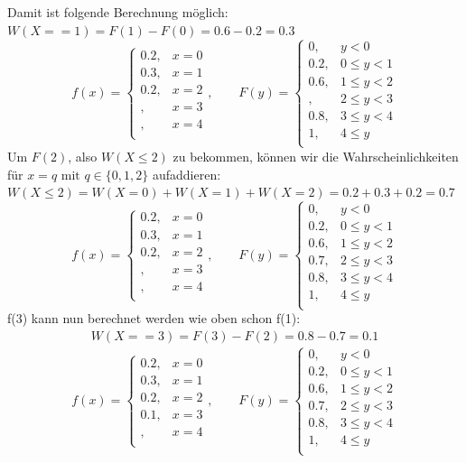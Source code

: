 \documentclass[11pt, a4paper]{article}
\begin{document}
Damit ist folgende Berechnung möglich: $W(X == 1) = F(1) - F(0) = 0.6 - 0.2 = 0.3$
\[
f(x) = 
\begin{cases}
	0.2, & x = 0 \\
	0.3, & x = 1 \\
	0.2, & x = 2 \\
	, & x = 3 \\
	, & x = 4 \\
\end{cases}, \qquad
F(y) =
\begin{cases}
	0, & y < 0 \\
	0.2, & 0 \leq y < 1 \\
	0.6, & 1 \leq y < 2 \\
	, & 2 \leq y < 3 \\
	0.8, & 3 \leq y < 4 \\
	1, & 4 \leq y \\
\end{cases}
\]
Um $F(2)$, also $W(X \leq 2)$ zu bekommen, können wir die Wahrscheinlichkeiten für $x = q \text{ mit } q \in \{0,1,2\}$ aufaddieren: $W(X \leq 2) = W(X = 0) + W(X = 1) + W(X = 2) = 0.2 + 0.3 + 0.2 = 0.7$
\[
f(x) = 
\begin{cases}
	0.2, & x = 0 \\
	0.3, & x = 1 \\
	0.2, & x = 2 \\
	, & x = 3 \\
	, & x = 4 \\
\end{cases}, \qquad
F(y) =
\begin{cases}
	0, & y < 0 \\
	0.2, & 0 \leq y < 1 \\
	0.6, & 1 \leq y < 2 \\
	0.7, & 2 \leq y < 3 \\
	0.8, & 3 \leq y < 4 \\
	1, & 4 \leq y \\
\end{cases}
\]
f(3) kann nun berechnet werden wie oben schon f(1):
\begin{align*}
	W(X == 3) = F(3) - F(2) = 0.8 - 0.7 = 0.1
\end{align*}
\[
f(x) = 
\begin{cases}
	0.2, & x = 0 \\
	0.3, & x = 1 \\
	0.2, & x = 2 \\
	0.1, & x = 3 \\
	, & x = 4 \\
\end{cases}, \qquad
F(y) =
\begin{cases}
	0, & y < 0 \\
	0.2, & 0 \leq y < 1 \\
	0.6, & 1 \leq y < 2 \\
	0.7, & 2 \leq y < 3 \\
	0.8, & 3 \leq y < 4 \\
	1, & 4 \leq y \\
\end{cases}
\]
\end{document}
